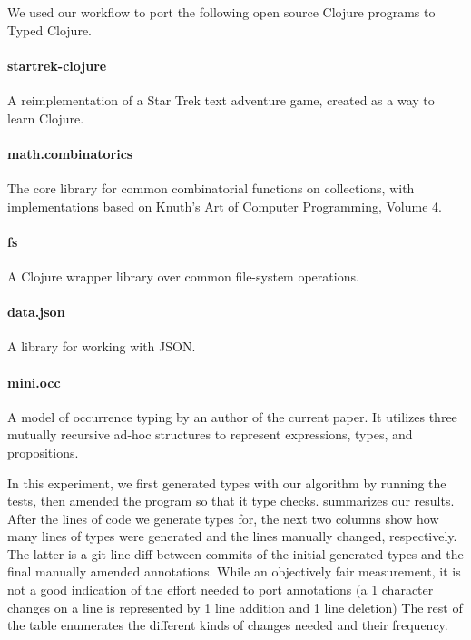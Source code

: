 We used our workflow to port the following open source Clojure programs to Typed Clojure.

\paragraph{startrek-clojure}
A reimplementation of a Star Trek text adventure game,
created as a way to learn Clojure.

\paragraph{math.combinatorics}
The core library for common combinatorial functions
on collections,
with implementations based on Knuth's Art of Computer
Programming, Volume 4.

\paragraph{fs}
A Clojure wrapper library over common file-system operations.

\paragraph{data.json}
A library for working with JSON.


\paragraph{mini.occ}
A model of occurrence typing by an author of the
current paper. It utilizes three mutually recursive
ad-hoc structures to represent expressions, types,
and propositions.

In this experiment, we first generated types with our algorithm
by running the tests, then amended the program so that it
type checks.
 summarizes our results.
After the lines of code we generate types for, the next two columns show how many lines of
types were generated and the lines manually changed, respectively.
The latter is a git line diff between commits of the initial
generated types and the final manually amended annotations.
While an objectively fair measurement,
it is not a good indication of the effort needed to port annotations
(a 1 character changes on a line is represented by 1 line addition and 1 line deletion)
The rest of the table enumerates the different kinds of changes needed 
and their frequency.

